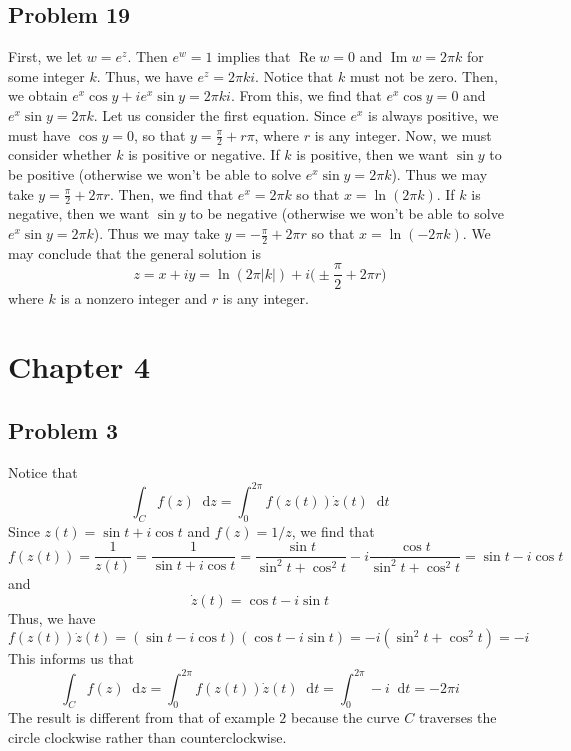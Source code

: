 \documentclass[12pt]{article}
\newcommand*\diff{\mathop{}\!\mathrm{d}}
\DeclareMathOperator{\imag}{Im}
\DeclareMathOperator{\re}{Re}
\begin{document}
\subsection*{Problem 19}
First, we let $w = e^z$. Then $e^{w} = 1$ implies that $\re w = 0$ and $\imag w = 2\pi k$ for some integer $k$. Thus, we have $e^z = 2\pi k i$. Notice that $k$ must not be zero. Then, we obtain $e^x \cos y + i e^x \sin y = 2\pi k i$. From this, we find that $e^x \cos y = 0$ and $e^x \sin y = 2\pi k$.  Let us consider the first equation. Since $e^x$ is always positive, we must have $\cos y = 0$, so that $y = \frac{\pi}{2} + r \pi$, where $r$ is any integer. Now, we must consider whether $k$ is positive or negative. If $k$ is positive, then we want $\sin y$ to be positive (otherwise we won't be able to solve $e^x \sin y = 2\pi k$). Thus we may take $y = \frac{\pi}{2} + 2\pi r$. Then, we find that $e^x = 2\pi k$ so that $x = \ln(2\pi k)$. If $k$ is negative, then we want $\sin y$ to be negative (otherwise we won't be able to solve $e^x \sin y= 2\pi k$). Thus we may take $y = -\frac{\pi}{2} + 2\pi r$ so that $x = \ln(-2\pi k)$. We may conclude that the general solution is 
\[
z = x + iy = \ln(2 \pi \vert k \vert) + i\bigg(\pm \frac{\pi}{2} + 2\pi r\bigg)
\] where $k$ is a nonzero integer and $r$ is any integer.
\newpage
\section*{Chapter 4}
\subsection*{Problem 3}
Notice that
\[
\int_{C} f(z) \diff z = \int_{0}^{2\pi} f(z(t))\dot{z}(t) \diff t
\] Since $z(t) = \sin t + i \cos t$ and $f(z) = 1/z$, we find that
\[
f(z(t)) = \frac{1}{z(t)} = \frac{1}{\sin t + i \cos t} = \frac{\sin t}{\sin^2 t + \cos^2 t} -  i\frac{\cos t}{\sin^2 t + \cos^2 t} = \sin t - i \cos t
\] and
\[
\dot{z}(t) = \cos t - i \sin t
\] Thus, we have
\[
f(z(t))\dot{z}(t) = (\sin t - i \cos t)(\cos t - i \sin t) = -i(\sin^2 t + \cos^2 t) = -i
\] This informs us that
\[
\int_{C} f(z) \diff z = \int_{0}^{2\pi} f(z(t))\dot{z}(t) \diff t = \int_{0}^{2\pi} -i \diff t = -2\pi i 
\] The result is different from that of example $2$ because the curve $C$ traverses the circle clockwise rather than counterclockwise.
\newpage
\end{document}
